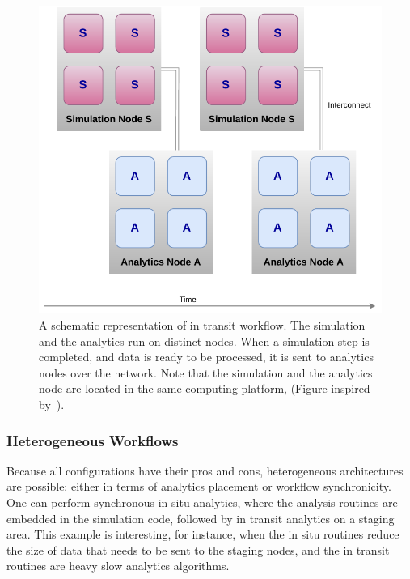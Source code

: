 \begin{figure}[h!]\centering
\includegraphics[scale=0.8]{figures/intransit.pdf}
\caption{A schematic representation of in transit workflow. The simulation and the analytics run on distinct nodes. When a simulation step is completed, and data is ready to be processed, it is sent to analytics nodes over the network. Note that the simulation and the analytics node are located in the same computing platform, (Figure inspired by~\cite{Estelle_integration_2018}).}
\label{figintransit}
\end{figure}

\subsubsection{Heterogeneous Workflows}
Because all configurations have their pros and cons, heterogeneous architectures are possible: either in terms of analytics placement or workflow synchronicity. One can perform synchronous in situ analytics, where the analysis routines are embedded in the simulation code, followed by in transit analytics on a staging area. This example is interesting, for instance, when the in situ routines reduce the size of data that needs to be sent to the staging nodes, and the in transit routines are heavy slow analytics algorithms.  

